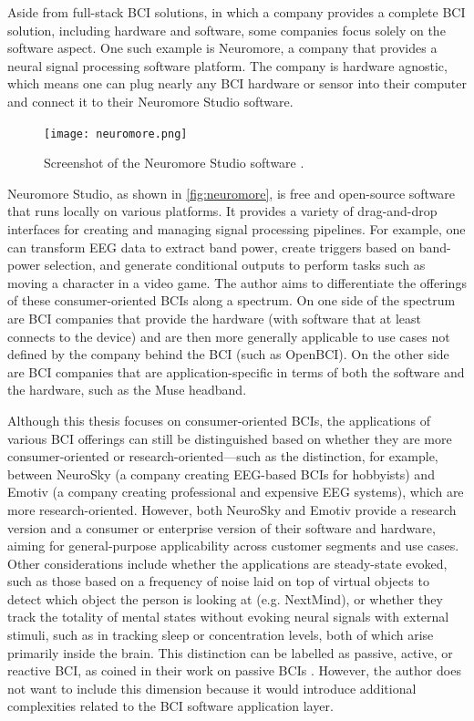 Aside from full-stack BCI solutions, in which a company provides a complete BCI solution, including hardware and software, some companies focus solely on the software aspect. One such example is Neuromore, a company that provides a neural signal processing software platform. The company is hardware agnostic, which means one can plug nearly any BCI hardware or sensor into their computer and connect it to their Neuromore Studio software.

\begin{figure}[ht]
  \centering
  \texttt{[image: neuromore.png]}
  \caption[Screenshot of the Neuromore Studio software.]{Screenshot of the Neuromore Studio software \citep{neuromore_neuromore_nodate}.}
  \label{fig:neuromore}
\end{figure}

Neuromore Studio, as shown in \autoref{fig:neuromore}, is free and open-source software that runs locally on various platforms. It provides a variety of drag-and-drop interfaces for creating and managing signal processing pipelines. For example, one can transform EEG data to extract band power, create triggers based on band-power selection, and generate conditional outputs to perform tasks such as moving a character in a video game. The author aims to differentiate the offerings of these consumer-oriented BCIs along a spectrum. On one side of the spectrum are BCI companies that provide the hardware (with software that at least connects to the device) and are then more generally applicable to use cases not defined by the company behind the BCI (such as OpenBCI). On the other side are BCI companies that are application-specific in terms of both the software and the hardware, such as the Muse headband.

Although this thesis focuses on consumer-oriented BCIs, the applications of various BCI offerings can still be distinguished based on whether they are more consumer-oriented or research-oriented—such as the distinction, for example, between NeuroSky (a company creating EEG-based BCIs for hobbyists) and Emotiv (a company creating professional and expensive EEG systems), which are more research-oriented. However, both NeuroSky and Emotiv provide a research version and a consumer or enterprise version of their software and hardware, aiming for general-purpose applicability across customer segments and use cases. Other considerations include whether the applications are steady-state evoked, such as those based on a frequency of noise laid on top of virtual objects to detect which object the person is looking at (e.g. NextMind), or whether they track the totality of mental states without evoking neural signals with external stimuli, such as in tracking sleep or concentration levels, both of which arise primarily inside the brain. This distinction can be labelled as passive, active, or reactive BCI, as \citeauthor{alimardani_passive_2020} coined in their work on passive BCIs \citep{alimardani_passive_2020}. However, the author does not want to include this dimension because it would introduce additional complexities related to the BCI software application layer.

